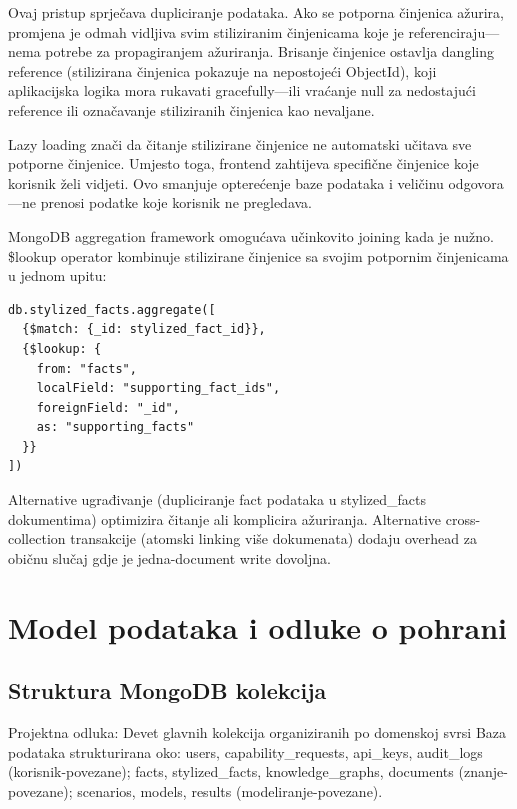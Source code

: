 \documentclass[12pt,a4paper]{article}
\begin{document}
Ovaj pristup sprječava dupliciranje podataka. Ako se potporna činjenica ažurira, promjena je odmah vidljiva svim stiliziranim činjenicama koje je referenciraju—nema potrebe za propagiranjem ažuriranja. Brisanje činjenice ostavlja dangling reference (stilizirana činjenica pokazuje na nepostojeći ObjectId), koji aplikacijska logika mora rukavati gracefully—ili vraćanje null za nedostajući reference ili označavanje stiliziranih činjenica kao nevaljane.

Lazy loading znači da čitanje stilizirane činjenice ne automatski učitava sve potporne činjenice. Umjesto toga, frontend zahtijeva specifične činjenice koje korisnik želi vidjeti. Ovo smanjuje opterećenje baze podataka i veličinu odgovora—ne prenosi podatke koje korisnik ne pregledava.

MongoDB aggregation framework omogućava učinkovito joining kada je nužno. \$lookup operator kombinuje stilizirane činjenice sa svojim potpornim činjenicama u jednom upitu:
\begin{verbatim}
db.stylized_facts.aggregate([
  {$match: {_id: stylized_fact_id}},
  {$lookup: {
    from: "facts",
    localField: "supporting_fact_ids",
    foreignField: "_id",
    as: "supporting_facts"
  }}
])
\end{verbatim}

Alternative ugrađivanje (dupliciranje fact podataka u stylized\_facts dokumentima) optimizira čitanje ali komplicira ažuriranja. Alternative cross-collection transakcije (atomski linking više dokumenata) dodaju overhead za običnu slučaj gdje je jedna-document write dovoljna.

\section{Model podataka i odluke o pohrani}

\subsection{Struktura MongoDB kolekcija}

\begin{rationale}{Projektna odluka: Devet glavnih kolekcija organiziranih po domenskoj svrsi}
Baza podataka strukturirana oko: users, capability\_requests, api\_keys, audit\_logs (korisnik-povezane); facts, stylized\_facts, knowledge\_graphs, documents (znanje-povezane); scenarios, models, results (modeliranje-povezane).
\end{rationale}
\end{document}

